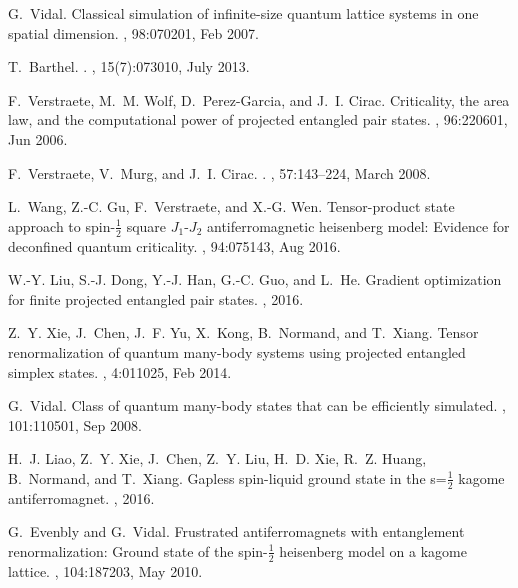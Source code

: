 \documentclass[preprint,3p,times,preprint,showpacs,amsmath,superscriptaddress,floatfix]{elsarticle}
\begin{document}
\begin{thebibliography}{10}
G.~Vidal.
\newblock Classical simulation of infinite-size quantum lattice systems in one
  spatial dimension.
, 98:070201, Feb 2007.

T.~{Barthel}.
.
, 15(7):073010, July 2013.

F.~Verstraete, M.~M. Wolf, D.~Perez-Garcia, and J.~I. Cirac.
\newblock Criticality, the area law, and the computational power of projected
  entangled pair states.
, 96:220601, Jun 2006.

F.~{Verstraete}, V.~{Murg}, and J.~I. {Cirac}.
.
, 57:143--224, March 2008.

L.~Wang, Z.-C. Gu, F.~Verstraete, and X.-G. Wen.
\newblock Tensor-product state approach to spin-$\frac{1}{2}$ square
  ${J}_{1}$-${J}_{2}$ antiferromagnetic heisenberg model: Evidence for
  deconfined quantum criticality.
, 94:075143, Aug 2016.

W.-Y. Liu, S.-J. Dong, Y.-J. Han, G.-C. Guo, and L.~He.
\newblock Gradient optimization for finite projected entangled pair states.
, 2016.

Z.~Y. Xie, J.~Chen, J.~F. Yu, X.~Kong, B.~Normand, and T.~Xiang.
\newblock Tensor renormalization of quantum many-body systems using projected
  entangled simplex states.
, 4:011025, Feb 2014.

G.~Vidal.
\newblock Class of quantum many-body states that can be efficiently simulated.
, 101:110501, Sep 2008.

H.~J. Liao, Z.~Y. Xie, J.~Chen, Z.~Y. Liu, H.~D. Xie, R.~Z. Huang, B.~Normand,
  and T.~Xiang.
\newblock Gapless spin-liquid ground state in the s=$\frac{1}{2}$ kagome
  antiferromagnet.
, 2016.

G.~Evenbly and G.~Vidal.
\newblock Frustrated antiferromagnets with entanglement renormalization: Ground
  state of the spin-$\frac{1}{2}$ heisenberg model on a kagome lattice.
, 104:187203, May 2010.


\end{thebibliography}
\end{document}
